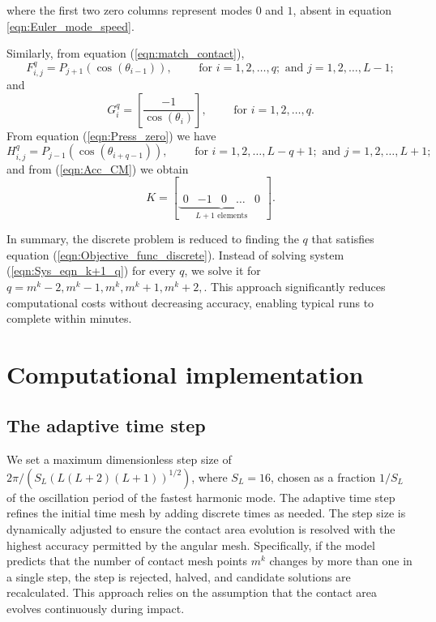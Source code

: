 \documentclass{jfm}
\begin{document}
where the first two zero columns represent modes $0$ and $1$, absent in equation \eqref{eqn:Euler_mode_speed}. 

Similarly, from equation (\ref{eqn:match_contact}), 
\begin{equation}
    F_{i,j}^q = P_{j+1}(\cos(\theta_{i-1})), 
    \qquad \text{ for } i= 1,2,\ldots,q; 
    \text{ and } j = 1,2,\ldots,L-1;
\end{equation} 
and
\begin{equation}
    G_i^q = \left [
    \frac{-1}{\cos(\theta_i)}    
    \right ], \qquad \text{ for } i= 1,2,\ldots,q.
\end{equation}
From equation (\ref{eqn:Press_zero}) we have
\begin{equation}
    H_{i,j}^q = P_{j-1}(\cos(\theta_{i + q-1})), 
    \qquad \text{ for } i= 1, 2,\ldots,L- q +1; \text{ and } j = 1,2,\ldots,L+1;
\end{equation} 
and from (\ref{eqn:Acc_CM}) we obtain
\begin{equation}
    K = \left[\underbrace{
    \begin{array}{ccccc}
       0 & -1 & 0 & \ldots & 0
    \end{array}}_{L+1 \text{ elements}}
    \right].
\end{equation}

In summary, the discrete problem is reduced to finding the $q$ that satisfies equation (\ref{eqn:Objective_func_discrete}). Instead of solving system (\ref{eqn:Sys_eqn_k+1_q}) for every $q$, we solve it for $q = m^k-2, m^k-1, m^k, m^k+1, m^k+2, $. This approach significantly reduces computational costs without decreasing accuracy, enabling typical runs to complete within minutes. 


\section{Computational implementation}\label{appC}

\subsection{The adaptive time step} \label{subsubsec:theadaptivetimestep}

We set a maximum dimensionless step size of $2\pi/\left(S_L \left( L(L+2)(L+1) \right)^{1/2} \right)$, where $S_L = 16$, chosen as a fraction $1/S_L$ of the oscillation period of the fastest harmonic mode. The adaptive time step refines the initial time mesh by adding discrete times as needed. The step size is dynamically adjusted to ensure the contact area evolution is resolved with the highest accuracy permitted by the angular mesh. Specifically, if the model predicts that the number of contact mesh points $m^{k}$ changes by more than one in a single step, the step is rejected, halved, and candidate solutions are recalculated. This approach relies on the assumption that the contact area evolves continuously during impact.
\end{document}
